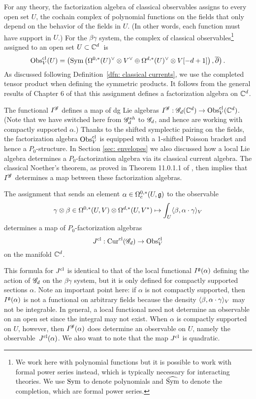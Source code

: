 For any theory, the factorization algebra of classical observables assigns to every open set $U$, the cochain complex of polynomial functions on the fields that only depend on the behavior of the fields in $U$.
(In other words, each function must have support in $U$.)  
For the $\beta\gamma$ system, the complex of classical observables\footnote{We work here with polynomial functions but it is possible to work with formal power series instead, which is typically necessary for interacting theories. We use ${\rm Sym}$ to denote polynomials and $\widehat{{\rm Sym}}$ to denote the completion, which are formal power series.} assigned to an open set $U \subset \mathbb C^d$~is
\[
{\rm Obs}^{{\rm cl}}_V(U) = \left({\rm Sym} \left(\Omega^{0,*}(U)^\vee \otimes V^\vee \oplus \Omega^{d,*}(U)^\vee \otimes V [-d+1]\right), \overline{\partial}\right) .
\]
As discussed following Definition~\ref{dfn: classical currents}, we use the completed tensor product when defining the symmetric products. 
It follows from the general results of Chapter 6 of \cite{CG2} that this assignment defines a factorization algebra on $\mathbb C^d$. 

The functional $I^{\mathscr G}$ defines a map of dg Lie algebras $I^{\mathscr G} : \mathscr G_d(\mathbb C^d) \to {\rm Obs}^{{\rm cl}}_V(\mathbb C^d)$.
(Note  that we have switched here from $\mathscr G^{sh}_d$ to $\mathscr G_d$, and hence are working with compactly supported $\alpha$.)
Thanks to the shifted symplectic pairing on the fields, 
the factorization algebra ${\rm Obs}_V^{{\rm cl}}$ is equipped with a 1-shifted Poisson bracket and hence a $P_0$-structure. 
In Section \ref{sec: envelopes} we also discussed how a local Lie algebra determines a $P_0$-factorization algebra via its classical current algebra. 
The classical Noether's theorem, as proved in Theorem 11.0.1.1 of \cite{CG2}, then implies that $I^{\mathscr G}$ determines a map between these factorization algebras. 

\begin{prop}
\label{prop:CNT}
The assignment that sends an element $\alpha \in \Omega^{0,*}_c(U, \mathfrak g)$ to the observable
\[
\gamma \otimes \beta \in \Omega^{0,*}(U, V) \otimes \Omega^{d,*}(U, V^*) \mapsto \int_U \langle\beta, \alpha \cdot \gamma\rangle_V
\]
determines a map of $P_0$-factorization algebras 
\[
J^{{\rm cl}} : {\rm Cur}^{{\rm cl}} (\mathscr G_d) \to {\rm Obs}^{{\rm cl}}_V 
\]
on the manifold $\mathbb C^d$.
\end{prop}

This formula for $J^{{\rm cl}}$ is identical to that of the local functional $I^\mathfrak g(\alpha)$ defining the action of $\mathscr G_d$ on the $\beta\gamma$ system,
but it is only defined for compactly supported sections $\alpha$.
Note an important point here: if $\alpha$ is not compactly supported, then $I^\mathfrak g(\alpha)$ is not a functional on arbitrary fields because the density $\langle\beta, \alpha \cdot \gamma\rangle_V$ may not be integrable.
In general, a local functional need not determine an observable on an open set since the integral may not exist.
When $\alpha$ is compactly supported on $U$, however, then $I^\mathscr G (\alpha)$ does determine an observable on $U$, namely the observable~$J^{{\rm cl}}(\alpha)$. 
We also want to note that the map $J^{{\rm cl}}$ is quadratic.

